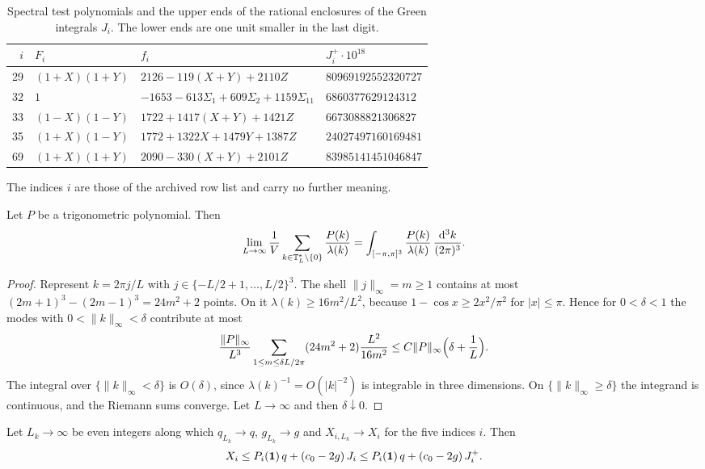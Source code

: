 \begin{table}[t]
\centering\small
\caption{Spectral test polynomials and the upper ends of the rational enclosures of the Green integrals $J_i$. The lower ends are one unit smaller in the last digit.}\label{tab:spectral}
\begin{tabular}{rlll}
\toprule
$i$ & $F_i$ & $f_i$ & $J_i^+\cdot10^{18}$ \\
\midrule
29 & $(1+X)(1+Y)$ & $2126-119(X+Y)+2110Z$ & $80969192552320727$\\
32 & $1$ & $-1653-613\Sigma_1+609\Sigma_2+1159\Sigma_{11}$ & $6860377629124312$\\
33 & $(1-X)(1-Y)$ & $1722+1417(X+Y)+1421Z$ & $6673088821306827$\\
35 & $(1+X)(1-Y)$ & $1772+1322X+1479Y+1387Z$ & $24027497160169481$\\
69 & $(1+X)(1+Y)$ & $2090-330(X+Y)+2101Z$ & $83985141451046847$\\
\bottomrule
\end{tabular}
\end{table}

The indices $i$ are those of the archived row list and carry no further meaning.

\begin{lemma}\label{lem:riemann}
Let $P$ be a trigonometric polynomial. Then
\[
 \lim_{L\to\infty}\frac1V\sum_{k\in\mathbb T_L^*\setminus\{0\}}\frac{P(k)}{\lambda(k)}=\int_{[-\pi,\pi]^3}\frac{P(k)}{\lambda(k)}\,\frac{\mathrm d^3k}{(2\pi)^3}.
\]
\end{lemma}

\begin{proof}
Represent $k=2\pi j/L$ with $j\in\{-L/2+1,\dots,L/2\}^3$. The shell $\|j\|_\infty=m\ge1$ contains at most $(2m+1)^3-(2m-1)^3=24m^2+2$ points. On it $\lambda(k)\ge16m^2/L^2$, because $1-\cos x\ge2x^2/\pi^2$ for $|x|\le\pi$. Hence for $0<\delta<1$ the modes with $0<\|k\|_\infty<\delta$ contribute at most
\[
 \frac{\|P\|_\infty}{L^3}\sum_{1\le m\le\delta L/2\pi}(24m^2+2)\frac{L^2}{16m^2}\le C\|P\|_\infty\Bigl(\delta+\frac1L\Bigr).
\]
The integral over $\{\|k\|_\infty<\delta\}$ is $O(\delta)$, since $\lambda(k)^{-1}=O(|k|^{-2})$ is integrable in three dimensions. On $\{\|k\|_\infty\ge\delta\}$ the integrand is continuous, and the Riemann sums converge. Let $L\to\infty$ and then $\delta\downarrow0$.
\end{proof}

\begin{lemma}\label{lem:spectral}
Let $L_k\to\infty$ be even integers along which $q_{L_k}\to q$, $g_{L_k}\to g$ and $X_{i,L_k}\to X_i$ for the five indices $i$. Then
\begin{equation}\label{eq:spectralrow}
 X_i\le P_i(\mathbf 1)\,q+(c_0-2g)\,J_i\le P_i(\mathbf 1)\,q+(c_0-2g)\,J_i^+ .
\end{equation}
\end{lemma}

